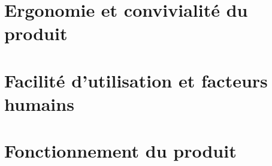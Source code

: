 \documentclass[a4paper, 12pt, french]{report}
\begin{document}
		\section{Ergonomie et convivialité du produit}
			

		\section{Facilité d'utilisation et facteurs humains}
			

		\section{Fonctionnement du produit}
			
		
\end{document}

